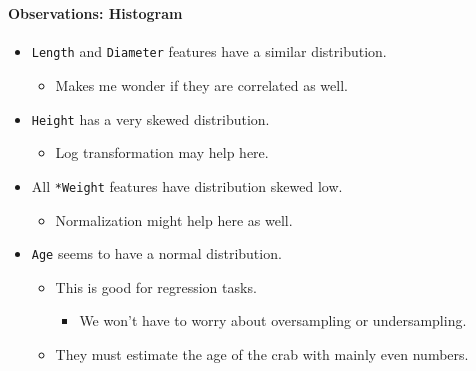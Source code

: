 \documentclass[11pt]{article}
\providecommand{\tightlist}{%
      \setlength{\itemsep}{0pt}\setlength{\parskip}{0pt}}
\begin{document}
    \begin{center}
    \end{center}
    { \hspace*{\fill} \\}
    
    \paragraph{Observations: Histogram}\label{observations-histogram}

\begin{itemize}
\tightlist
\item
  \texttt{Length} and \texttt{Diameter} features have a similar
  distribution.

  \begin{itemize}
  \tightlist
  \item
    Makes me wonder if they are correlated as well.
  \end{itemize}
\item
  \texttt{Height} has a very skewed distribution.

  \begin{itemize}
  \tightlist
  \item
    Log transformation may help here.
  \end{itemize}
\item
  All \texttt{*Weight} features have distribution skewed low.

  \begin{itemize}
  \tightlist
  \item
    Normalization might help here as well.
  \end{itemize}
\item
  \texttt{Age} seems to have a normal distribution.

  \begin{itemize}
  \tightlist
  \item
    This is good for regression tasks.

    \begin{itemize}
    \tightlist
    \item
      We won't have to worry about oversampling or undersampling.
    \end{itemize}
  \item
    They must estimate the age of the crab with mainly even numbers.
  \end{itemize}
\end{itemize}
\end{document}
